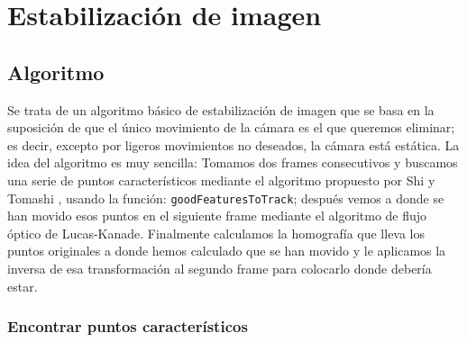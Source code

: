 \documentclass[a4paper,openright, 12pt]{book}
\begin{document}
\chapter{Estabilización de imagen}\label{cap.}

\section{Algoritmo}
Se trata de un algoritmo básico de estabilización de imagen que se basa en la suposición de que el único movimiento de la cámara es el que queremos eliminar; es decir, excepto por ligeros movimientos no deseados, la cámara está estática.
La idea del algoritmo es muy sencilla: 
Tomamos dos frames consecutivos y buscamos una serie de puntos característicos mediante el algoritmo propuesto por Shi y Tomashi \cite{shiandtomasi}, usando la función: \lstinline|goodFeaturesToTrack|; después vemos a donde se han movido esos puntos en el siguiente frame mediante el algoritmo de flujo óptico de Lucas-Kanade.
Finalmente calculamos la homografía que lleva los puntos originales a donde hemos calculado que se han movido y le aplicamos la inversa de esa transformación al segundo frame para colocarlo donde debería estar.
\subsection{Encontrar puntos característicos}
\end{document}
